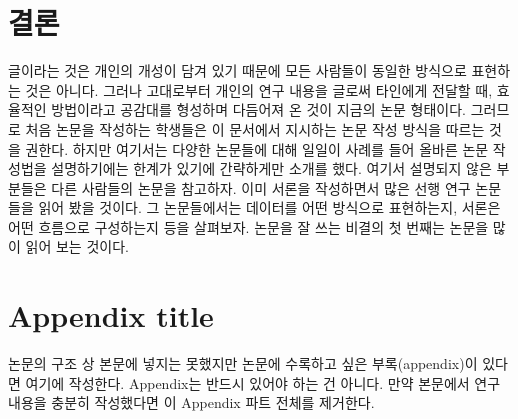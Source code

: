 \documentclass[twoside,11pt]{gshs_thesis}
\begin{document}
\section{결론}
글이라는 것은 개인의 개성이 담겨 있기 때문에 모든 사람들이 동일한 방식으로 표현하는 것은 아니다. 그러나 고대로부터 개인의 연구 내용을 글로써 타인에게 전달할 때, 효율적인 방법이라고 공감대를 형성하며 다듬어져 온 것이 지금의 논문 형태이다. 그러므로 처음 논문을 작성하는 학생들은 이 문서에서 지시하는 논문 작성 방식을 따르는 것을 권한다. 하지만 여기서는 다양한 논문들에 대해 일일이 사례를 들어 올바른 논문 작성법을 설명하기에는 한계가 있기에 간략하게만 소개를 했다. 여기서 설명되지 않은 부분들은 다른 사람들의 논문을 참고하자. 이미 서론을 작성하면서 많은 선행 연구 논문들을 읽어 봤을 것이다. 그 논문들에서는 데이터를 어떤 방식으로 표현하는지, 서론은 어떤 흐름으로 구성하는지 등을 살펴보자. 논문을 잘 쓰는 비결의 첫 번째는 논문을 많이 읽어 보는 것이다.


\clearpage  %
\appendix
\renewcommand{\thesection}{\Alph{section}} %
\renewcommand{\theequation}{\thesection.\arabic{equation}} %
\renewcommand{\thefigure}{\thesection-\arabic{figure}} %
\renewcommand{\thetable}{\thesection-\arabic{table}} %
\setcounter{equation}{0} %
\setcounter{figure}{0} %
\setcounter{table}{0} %
\section{Appendix title}
논문의 구조 상 본문에 넣지는 못했지만 논문에 수록하고 싶은 부록(appendix)이 있다면 여기에 작성한다. Appendix는 반드시 있어야 하는 건 아니다. 만약 본문에서 연구 내용을 충분히 작성했다면 이 Appendix 파트 전체를 제거한다. 
\end{document}
